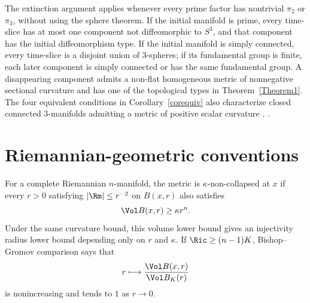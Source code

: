 \begin{remark}
\label{rem:extinction-remarks}
The extinction argument applies whenever every prime factor has nontrivial
$\pi_2$ or $\pi_3$, without using the sphere theorem. If the initial manifold
is prime, every time-slice has at most one component not diffeomorphic to
$S^3$, and that component has the initial diffeomorphism type. If the initial
manifold is simply connected, every time-slice is a disjoint union of
$3$-spheres; if its fundamental group is finite, each later component is
simply connected or has the same fundamental group. A disappearing component
admits a non-flat homogeneous metric of nonnegative sectional curvature and
has one of the topological types in Theorem~\ref{Theorem1}. The four equivalent
conditions in Corollary~\ref{corequiv} also characterize closed connected
$3$-manifolds admitting a metric of positive scalar curvature
\cite{SchoenYau2}.
\cite{AG,AG,CaoZhu,Cheeger,ChowKnopf,ChowLuNi,ColdingMinicozzi,ColdingMinicozzi,ColdingMinicozzi,GreeneWu,Gromov,Gromov,Hamilton3MPRC,Hamilton3MPRC,Hamilton3MPRC,Hamilton3MPRC,Hamilton3MPRC,Hamilton3MPRC,Hamilton4MPCO,Hamilton4MPIC,Hamilton4MPIC,HamiltonIFTNM,HamiltonNSRF3M,HamiltonNSRF3M,HamiltonNSRF3M,HamiltonNSRF3M,Hamiltonharnack,Hamiltonlimits,Hamiltonlimits,Hamiltonsurvey,Hamiltonsurvey,Hamiltonsurvey,Hempel,Jost,Kap,KleinerLott,KleinerLott,KleinerLott2,LiYau,Milnorsurvey,MorganTian2,Perelman1,Perelman1,Perelman2,Perelman2,Perelman2,Perelman2,Perelman2,Perelman2,Perelman3,Perelman3,Perelman3,Perelman3,Perelman3,Perelman3,Poincare,SPeters,STW,SY,SY,Scott,Shi1,Shi2,Thurstongeom,yuding}.
\end{remark}

\section{Riemannian-geometric conventions}

For a complete Riemannian $n$-manifold, the metric is
$\kappa$-non-collapsed at $x$ if every $r>0$ satisfying
$|\Rm|\leq r^{-2}$ on $B(x,r)$ also satisfies
\[
  \Vol B(x,r)\geq \kappa r^n.
\]
Under the same curvature bound, this volume lower bound gives an injectivity
radius lower bound depending only on $r$ and $\kappa$. If
$\Ric\geq(n-1)K$, Bishop--Gromov comparison says that
\[
  r\longmapsto
  \frac{\Vol B(x,r)}{\Vol B_K(r)}
\]
is nonincreasing and tends to $1$ as $r\to0$.

